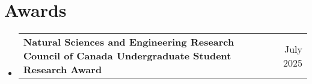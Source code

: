 \documentclass[letterpaper,11pt]{article}
\makeatletter
\newcommand{\resumeItem}[1]{
  \item\small{
    {#1 \vspace{-2pt}}
  }
}
\newcommand{\resumeProjectHeading}[2]{
    \item
    \begin{tabular*}{0.97\textwidth}{l@{\extracolsep{\fill}}r}
      \small#1 & #2 \\
    \end{tabular*}\vspace{-7pt}
}
\newcommand{\resumeSubHeadingListStart}{\begin{itemize}[leftmargin=0.15in, label={}]}
\newcommand{\resumeSubHeadingListEnd}{\end{itemize}}
\newcommand{\resumeItemListStart}{\begin{itemize}}
\newcommand{\resumeItemListEnd}{\end{itemize}\vspace{-5pt}}
\makeatother
\begin{document}

\section{Awards}
\resumeSubHeadingListStart

\resumeProjectHeading
{{\textbf{Natural Sciences and Engineering Research Council of Canada Undergraduate Student Research Award}}}{July 2025}



\resumeSubHeadingListEnd

\end{document}
